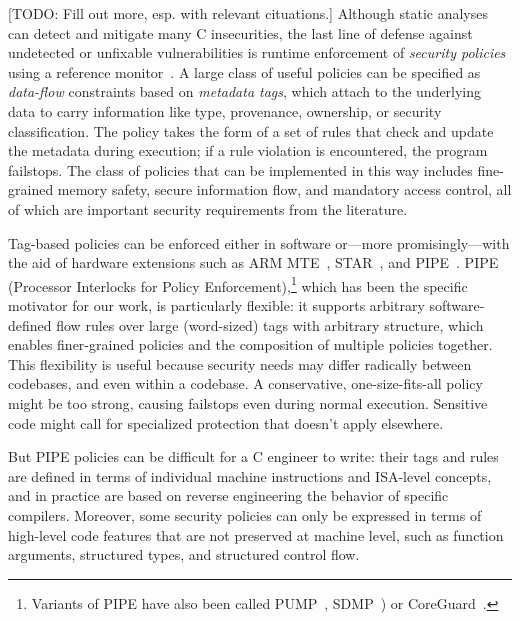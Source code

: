 \documentclass{llncs}
\begin{document}
[TODO: Fill out more, esp. with relevant cituations.] Although static
analyses can detect and mitigate many C insecurities, the last line of
defense against undetected or unfixable vulnerabilities is runtime
enforcement of {\em security policies} using a reference
monitor~\cite{Anderson72:PlanningStudy}. A large class of useful policies
can be specified as \emph{data-flow} constraints based on \emph{metadata tags},
which attach to the underlying data to carry information like type, provenance,
ownership, or security classification. The policy takes the form of a set of
rules that check and update the metadata during execution; if a rule violation is
encountered, the program failstops. The class of policies that can be implemented
in this way includes fine-grained memory safety, secure information flow,
and mandatory access control, all of which are important security requirements
from the literature.

Tag-based policies can be enforced either in software or---more promisingly---with the
aid of hardware extensions such as ARM MTE~\cite{arm-mte},
STAR~\cite{Gollapudi+23}, and
PIPE~\cite{Dhawan+15,Azevedo+16,Azevedo+15}.  PIPE (Processor
Interlocks for Policy Enforcement),\footnote{ Variants of PIPE have
also been called PUMP~\cite{Dhawan+14,Dhawan+15},
SDMP~\cite{Dover16,RoesslerD18}) or CoreGuard~\cite{Dover20}.}
which has been the specific motivator for our work, is particularly flexible: it supports
arbitrary software-defined flow rules over large (word-sized) tags with arbitrary structure,
which enables finer-grained policies and the composition of multiple policies together.
This flexibility is useful because security needs may differ radically between codebases,
and even within a codebase. A conservative, one-size-fits-all policy might be too strong,
causing failstops even during normal execution. Sensitive code might call for specialized
protection that doesn't apply elsewhere.

But PIPE policies can be difficult for a C engineer to write: their tags and rules
are defined in terms of individual machine instructions and ISA-level
concepts, and in practice are based on reverse engineering the behavior
of specific compilers. 
Moreover, some security policies can only be expressed in terms of high-level code
features that are not preserved at machine level, such as function
arguments, structured types, and structured control flow.
\end{document}
